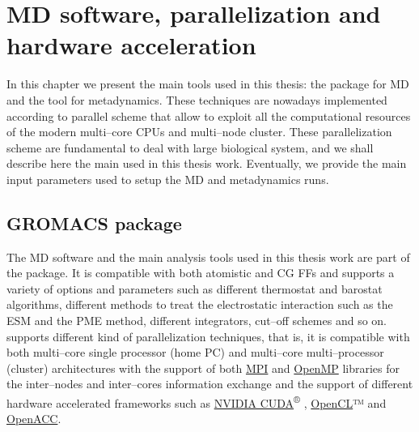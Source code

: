 \chapter{MD software, parallelization and hardware acceleration}
In this chapter we present the main tools used in this thesis: the \href{http://www.gromacs.org}{\gromacs} 
package for \ac{MD} and the \href{http://www.plumed.org}{\plumed} tool for metadynamics. These techniques are 
nowadays implemented according to parallel scheme that allow to exploit all the computational resources of the 
modern multi--core CPUs and multi--node cluster. These parallelization scheme are fundamental to deal with large 
biological system, and we shall describe here the main used in this thesis work. Eventually, we provide the main 
input parameters used to setup the \ac{MD} and metadynamics runs. 


\section{GROMACS package}
The \ac{MD} software and the main analysis tools used in this thesis work are part of the 
\href{http://www.gromacs.org}{\gromacs}\cite{gromacsManual} package. It is compatible with both atomistic and 
\ac{CG} \acp{FF} and supports a variety of options and parameters such as different thermostat and barostat 
algorithms, different methods to treat the electrostatic interaction such as the \ac{ESM} and the \ac{PME} 
method, different integrators, cut--off schemes and so on. \gromacs supports different kind of parallelization 
techniques, that is, it is compatible with both multi--core single processor (home PC) and multi--core 
multi--processor (cluster) architectures with the support of both 
\href{https://computing.llnl.gov/tutorials/mpi/}{MPI}
and \href{https://computing.llnl.gov/tutorials/openMP/}{OpenMP}
libraries for the inter--nodes and inter--cores information exchange and the support of different hardware 
accelerated frameworks such as \href{https://developer.nvidia.com/cuda-zone}{NVIDIA CUDA}\textsuperscript{®}
, \href{https://www.khronos.org/opencl/}{OpenCL}™
 and \href{http://www.openacc.org}{OpenACC}.

